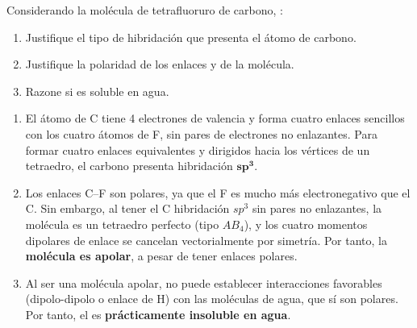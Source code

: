 \begin{exerciseEVAU}

    Considerando la molécula de tetrafluoruro de carbono, :
    \begin{enumerate}[label=\letraminuscula]
        \item Justifique el tipo de hibridación que presenta el átomo de carbono.
        \item Justifique la polaridad de los enlaces y de la molécula.
        \item Razone si es soluble en agua.
    \end{enumerate}

    \begin{solu}
        \begin{enumerate}[label=\letraminuscula]
            \item El átomo de C tiene 4 electrones de valencia y forma cuatro enlaces sencillos con los cuatro átomos de F, sin pares de electrones no enlazantes. Para formar cuatro enlaces equivalentes y dirigidos hacia los vértices de un tetraedro, el carbono presenta hibridación \(\bm{sp^3}\).

            \item Los enlaces C--F son polares, ya que el F es mucho más electronegativo que el C. Sin embargo, al tener el C hibridación \(sp^3\) sin pares no enlazantes, la molécula es un tetraedro perfecto (tipo \(AB_4\)), y los cuatro momentos dipolares de enlace se cancelan vectorialmente por simetría. Por tanto, la \textbf{molécula  es apolar}, a pesar de tener enlaces polares.

            \item Al ser una molécula apolar, no puede establecer interacciones favorables (dipolo-dipolo o enlace de H) con las moléculas de agua, que sí son polares. Por tanto, el  es \textbf{prácticamente insoluble en agua}.
        \end{enumerate}
    \end{solu}
\end{exerciseEVAU}

